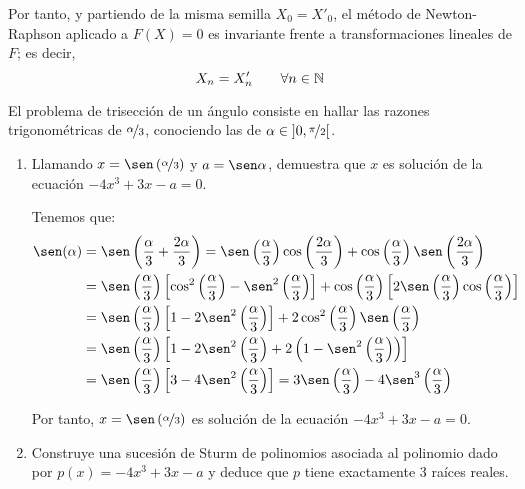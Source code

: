 \begin{ejercicio}
\begin{enumerate}
        Por tanto, y partiendo de la misma semilla $X_0=X'_0$, el método de Newton-Raphson aplicado a $F(X) = 0$ es invariante frente a transformaciones lineales de $F$; es decir,
        \begin{equation*}
            X_n = X'_n\qquad \forall n\in \mathbb{N}
        \end{equation*}
    \end{enumerate}
\end{ejercicio}

\begin{ejercicio}[DGIIM 2023/2024]
    El problema de trisección de un ángulo consiste en hallar las razones trigonométricas de $\nicefrac{\alpha}{3}$, conociendo las de $\alpha \in \left]0,\nicefrac{\pi}{2}\right[$.
    \begin{enumerate}
        \item Llamando $x = \sen\left(\nicefrac{\alpha}{3}\right)$ y $a = \sen \alpha$, demuestra que $x$ es solución de la ecuación $-4x^3 + 3x - a = 0$.
        
        Tenemos que:
        \begin{align*}
            \sen(\alpha)
            &= \sen\left(\dfrac{\alpha}{3}+\dfrac{2\alpha}{3}\right)=\sen\left(\dfrac{\alpha}{3}\right)\cos\left(\dfrac{2\alpha}{3}\right)+\cos\left(\dfrac{\alpha}{3}\right)\sen\left(\dfrac{2\alpha}{3}\right)\\
            &= \sen\left(\dfrac{\alpha}{3}\right)\left[\cos^2\left(\dfrac{\alpha}{3}\right)-\sen^2\left(\dfrac{\alpha}{3}\right)\right]+\cos\left(\dfrac{\alpha}{3}\right)\left[2\sen\left(\dfrac{\alpha}{3}\right)\cos\left(\dfrac{\alpha}{3}\right)\right]\\
            &= \sen\left(\dfrac{\alpha}{3}\right)\left[1-2\sen^2\left(\dfrac{\alpha}{3}\right)\right]+2\cos^2\left(\dfrac{\alpha}{3}\right)\sen\left(\dfrac{\alpha}{3}\right)\\
            &= \sen\left(\dfrac{\alpha}{3}\right)\left[1-2\sen^2\left(\dfrac{\alpha}{3}\right)+2\left(1-\sen^2\left(\dfrac{\alpha}{3}\right)\right)\right]\\
            &= \sen\left(\dfrac{\alpha}{3}\right)\left[3-4\sen^2\left(\dfrac{\alpha}{3}\right)\right]
            = 3\sen\left(\dfrac{\alpha}{3}\right)-4\sen^3\left(\dfrac{\alpha}{3}\right)
        \end{align*}

        Por tanto, $x=\sen\left(\nicefrac{\alpha}{3}\right)$ es solución de la ecuación $-4x^3 + 3x - a = 0$.

        \item Construye una sucesión de Sturm de polinomios asociada al polinomio dado por $p(x) = -4x^3 + 3x - a$ y deduce que $p$ tiene exactamente 3 raíces reales.\\
        

\end{enumerate}
\end{ejercicio}

